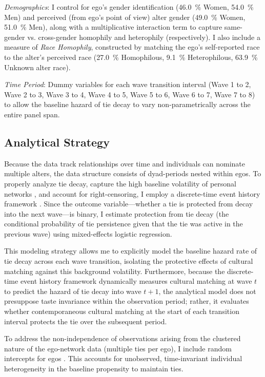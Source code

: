 \documentclass[12pt,letterpaper]{article}
\def\percent{\%}%
\begin{document}
\emph{Demographics}: I control for ego's gender identification (\SI{46.0}{\percent} Women, \SI{54.0}{\percent} Men) and perceived (from ego's point of view) alter gender (\SI{49.0}{\percent} Women, \SI{51.0}{\percent} Men), along with a multiplicative interaction term to capture same-gender vs. cross-gender homophily and heterophily (respectively). I also include a measure of \emph{Race Homophily}, constructed by matching the ego's self-reported race to the alter's perceived race (\SI{27.0}{\percent} Homophilous, \SI{9.1}{\percent} Heterophilous, \SI{63.9}{\percent} Unknown alter race).

\emph{Time Period}: Dummy variables for each wave transition interval (Wave 1 to 2, Wave 2 to 3, Wave 3 to 4, Wave 4 to 5, Wave 5 to 6, Wave 6 to 7, Wave 7 to 8) to allow the baseline hazard of tie decay to vary non-parametrically across the entire panel span.

\subsection{Analytical Strategy}\label{analytical-strategy}

Because the data track relationships over time and individuals can nominate multiple alters, the data structure consists of dyad-periods nested within egos. To properly analyze tie decay, capture the high baseline volatility of personal networks \citep{cornwell2021tracking, weiss2022life}, and account for right-censoring, I employ a discrete-time event history framework \citep{singer1993s}. Since the outcome variable---whether a tie is protected from decay into the next wave---is binary, I estimate protection from tie decay (the conditional probability of tie persistence given that the tie was active in the previous wave) using mixed-effects logistic regression. 

This modeling strategy allows me to explicitly model the baseline hazard rate of tie decay across each wave transition, isolating the protective effects of cultural matching against this background volatility. Furthermore, because the discrete-time event history framework dynamically measures cultural matching at wave $t$ to predict the hazard of tie decay into wave $t+1$, the analytical model does not presuppose taste invariance within the observation period; rather, it evaluates whether contemporaneous cultural matching at the start of each transition interval protects the tie over the subsequent period.

To address the non-independence of observations arising from the clustered nature of the ego-network data (multiple ties per ego), I include random intercepts for egos \citep{agresti2007introduction-1cf}. This accounts for unobserved, time-invariant individual heterogeneity in the baseline propensity to maintain ties.
\end{document}
